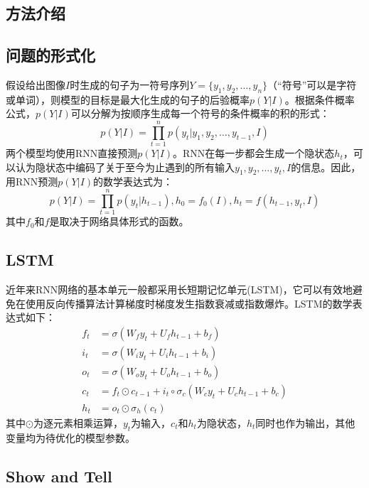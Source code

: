 \documentclass[10pt,a4paper,UTF8]{ctexart}
\begin{document}
\begin{spacing}{1.5}
		\section{方法介绍}
		
		\subsection{问题的形式化}
		
		假设给出图像$I$时生成的句子为一符号序列$Y=\{y_1,y_2,\dots,y_n\}$（“符号”可以是字符或单词），则模型的目标是最大化生成的句子的后验概率$p(Y|I)$。根据条件概率公式，$p(Y|I)$可以分解为按顺序生成每一个符号的条件概率的积的形式：
		\begin{equation}
		p(Y|I)=\prod_{t=1}^n p(y_t|y_1,y_2,\dots,y_{t-1},I)
		\end{equation}
		两个模型均使用RNN直接预测$p(Y|I)$。RNN在每一步都会生成一个隐状态$h_t$，可以认为隐状态中编码了关于至今为止遇到的所有输入$y_1,y_2,\dots,y_{t},I$的信息。因此，用RNN预测$p(Y|I)$的数学表达式为：
		\begin{equation}
		p(Y|I)=\prod_{t=1}^n p(y_t|h_{t-1}), h_0=f_0(I), h_t=f(h_{t-1}, y_t, I)
		\end{equation}
		其中$f_0$和$f$是取决于网络具体形式的函数。
		
		\subsection{LSTM}
		
		近年来RNN网络的基本单元一般都采用长短期记忆单元(LSTM)，它可以有效地避免在使用反向传播算法计算梯度时梯度发生指数衰减或指数爆炸。LSTM的数学表达式如下：
		\begin{align*}
		f_t &= \sigma(W_{f} y_t + U_{f} h_{t-1} + b_f) \\
		i_t &= \sigma(W_{i} y_t + U_{i} h_{t-1} + b_i) \\
		o_t &= \sigma(W_{o} y_t + U_{o} h_{t-1} + b_o) \\
		c_t &= f_t \odot c_{t-1} + i_t \circ \sigma_c(W_{c} y_t + U_{c} h_{t-1} + b_c) \\
		h_t &= o_t \odot \sigma_h(c_t)
		\end{align*}
		其中$\odot$为逐元素相乘运算，$y_t$为输入，$c_t$和$h_t$为隐状态，$h_t$同时也作为输出，其他变量均为待优化的模型参数。
		
		\subsection{Show and Tell}
		

\end{spacing}
\end{document}
